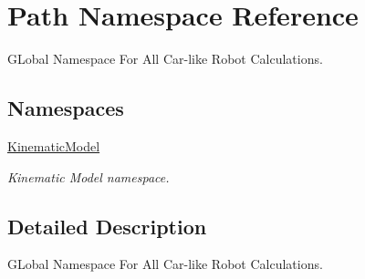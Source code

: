 \hypertarget{namespace_path}{}\section{Path Namespace Reference}
\label{namespace_path}


G\+Lobal Namespace For All Car-\/like Robot Calculations.  


\subsection*{Namespaces}
\begin{DoxyCompactItemize}
\item 
 \hyperlink{namespace_path_1_1_kinematic_model}{Kinematic\+Model}
\begin{DoxyCompactList}\small\item\em Kinematic Model namespace. \end{DoxyCompactList}\end{DoxyCompactItemize}


\subsection{Detailed Description}
G\+Lobal Namespace For All Car-\/like Robot Calculations. 

